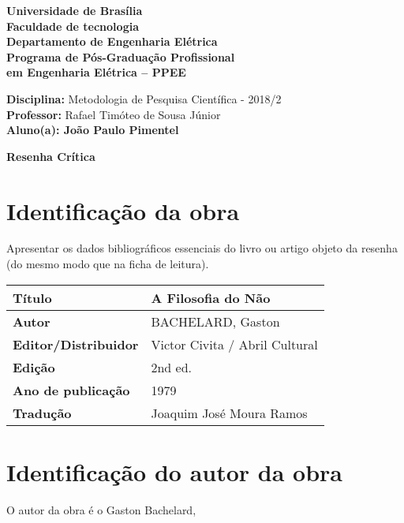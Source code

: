 \documentclass[11pt]{article}
\begin{document}
\noindent
\begin{center}
	\Large\textbf{Universidade de Brasília}\\
	\Large\textbf{Faculdade de tecnologia}\\
	\Large\textbf{Departamento de Engenharia Elétrica}\\
	\Large\textbf{Programa de Pós-Graduação Profissional \\
		em Engenharia Elétrica -- PPEE}\\
\end{center}

\large{
	\noindent
	\textbf{Disciplina:} Metodologia de Pesquisa Científica - 2018/2\\
	\textbf{Professor:} Rafael Timóteo de Sousa Júnior \\
	\textbf{Aluno(a): João Paulo Pimentel}}\\

\begin{center}
\Large\textbf{Resenha Crítica}
\end{center}
\normalsize

\section{Identificação da obra}
    Apresentar os dados bibliográficos essenciais do livro ou artigo objeto da resenha (do mesmo modo que na ficha de leitura).

\begin{center}
	\begin{tabular}{|l|l|} \hline
		\textbf{Título} & A Filosofia do Não\cite{Bachelard1979} \\ \hline
		\textbf{Autor} & BACHELARD, Gaston \\ \hline
		\textbf{Editor/Distribuidor} & Victor Civita / Abril Cultural
 \\ \hline
		\textbf{Edição} & 2nd ed. \\ \hline
		\textbf{Ano de publicação} & 1979 \\ \hline
		\textbf{Tradução} &  Joaquim José Moura Ramos \\ \hline
	\end{tabular}
\end{center}

\section{Identificação do autor da obra}

    O autor da obra é o Gaston Bachelard, 
\end{document}
